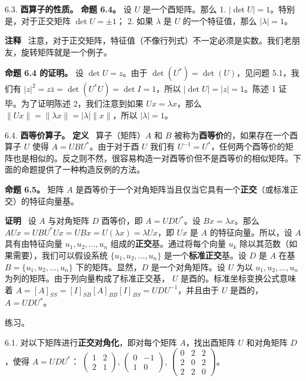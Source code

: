 6.3. \textbf{酉算子的性质。}
\textbf{命题 6.4。} 设 $U$ 是一个酉矩阵。那么
1. $|\det U| = 1$。特别是，对于正交矩阵 $\det U = \pm 1$；
2. 如果 $\lambda$ 是 $U$ 的一个特征值，那么 $|\lambda| = 1$。

\textbf{注释} ~注意，对于正交矩阵，特征值（不像行列式）不一定必须是实数。我们老朋友，旋转矩阵就是一个例子。




\textbf{命题 6.4 的证明。} 设 $\det U = z$。由于 $\det(U^*) = \det(U)$，见问题 5.1，我们有 $|z|^2 = z\bar{z} = \det(U^*U) = \det I = 1$，所以 $|\det U| = |z| = 1$。陈述 1 证毕。为了证明陈述 2，我们注意到如果 $Ux = \lambda x$，那么 $\|Ux\| = \|\lambda x\| = |\lambda|\|x\|$，所以 $|\lambda| = 1$。

6.4. \textbf{酉等价算子。}
\textbf{定义}~ 算子（矩阵）$A$ 和 $B$ 被称为\textbf{酉等价}的，如果存在一个酉算子 $U$ 使得 $A = UBU^*$。由于对于酉 $U$ 我们有 $U^{-1} = U^*$，任何两个酉等价的矩阵也是相似的。反之则不然，很容易构造一对酉等价但不是酉等价的相似矩阵。下面的命题提供了一种构造反例的方法。

\textbf{命题 6.5。} 矩阵 $A$ 是酉等价于一个对角矩阵当且仅当它具有一个\textbf{正交}（或标准正交）的特征向量基。

\textbf{证明}~ 设 $A$ 与对角矩阵 $D$ 酉等价，即 $A = UDU^*$。设 $Bx = \lambda x$。那么 $AUx = UBU^*Ux = U Bx = U(\lambda x) = \lambda Ux$，即 $Ux$ 是 $A$ 的特征向量。所以，设 $A$ 具有由特征向量 $u_1, u_2, \dots, u_n$ 组成的\textbf{正交}基。通过将每个向量 $u_k$ 除以其范数（如果需要），我们可以假设系统 $\{u_1, u_2, \dots, u_n\}$ 是一个\textbf{标准正交}基。设 $D$ 是 $A$ 在基 $B = \{u_1, u_2, \dots, u_n\}$ 下的矩阵。显然，$D$ 是一个对角矩阵。设 $U$ 为以 $u_1, u_2, \dots, u_n$ 为列的矩阵。由于列向量构成了标准正交基， $U$ 是酉的。标准坐标变换公式意味着 $A = [A]_{SS} = [I]_{SB}[A]_{BB}[I]_{BS} = UDU^{-1}$，并且由于 $U$ 是酉的，$A = UDU^*$。



练习。

6.1. 对以下矩阵进行\textbf{正交对角化}，即对每个矩阵 $A$，找出酉矩阵 $U$ 和对角矩阵 $D$，使得 $A = UDU^*$：
$\begin{pmatrix} 1 & 2 \\ 2 & 1 \end{pmatrix}$, $\begin{pmatrix} 0 & -1 \\ 1 & 0 \end{pmatrix}$, $\begin{pmatrix} 0 & 2 & 2 \\ 2 & 0 & 2 \\ 2 & 2 & 0 \end{pmatrix}$。

